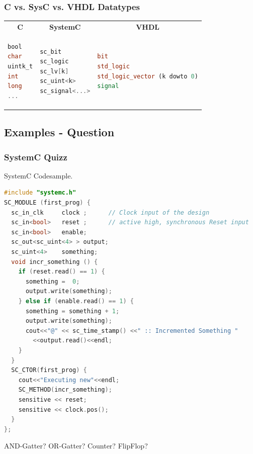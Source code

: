 \documentclass{beamer}
\begin{document}
\begin{frame}[fragile] \frametitle{C vs. SysC vs. VHDL Datatypes} 
\begin{tabular}{p{}|p{}|p{}}
\multicolumn{1}{c}{\textbf{C}} & \multicolumn{1}{c}{\textbf{SystemC}} & \multicolumn{1}{c}{\textbf{VHDL}} \\
\begin{lstlisting}[language=C]
bool
char
uintk_t
int 
long
...
\end{lstlisting}
& 
\begin{lstlisting}[language=C++, ]
sc_bit
sc_logic
sc_lv[k]
sc_uint<k>
sc_signal<...>
\end{lstlisting}
 &  
\begin{lstlisting}[language=VHDL]
bit
std_logic
std_logic_vector (k dowto 0)
signal
\end{lstlisting}
\end{tabular}

\end{frame}

\subsection{Examples - Question}
\begin{frame}[fragile]\frametitle{SystemC Quizz} 
SystemC Codesample.
\begin{lstlisting}[language=C++,basicstyle=\tiny]
#include "systemc.h"
SC_MODULE (first_prog) {
  sc_in_clk     clock ;      // Clock input of the design
  sc_in<bool>   reset ;      // active high, synchronous Reset input
  sc_in<bool>   enable;     
  sc_out<sc_uint<4> > output;
  sc_uint<4>	something;
  void incr_something () {
    if (reset.read() == 1) {
      something =  0;
      output.write(something);
    } else if (enable.read() == 1) {
      something = something + 1;
      output.write(something);
      cout<<"@" << sc_time_stamp() <<" :: Incremented Something "
        <<output.read()<<endl;
    }
  }
  SC_CTOR(first_prog) {
    cout<<"Executing new"<<endl;
    SC_METHOD(incr_something);
    sensitive << reset;
    sensitive << clock.pos();
  }
};
\end{lstlisting}
AND-Gatter? OR-Gatter? Counter? FlipFlop?
\end{frame}
\end{document}

